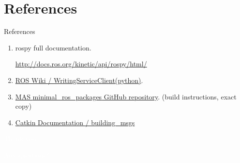 \documentclass{beamer}
\begin{document}
\section{References}
\begin{frame}{References}

    \begin{enumerate}
        \item rospy full documentation.

        \url{http://docs.ros.org/kinetic/api/rospy/html/}
        
        \item \href{http://wiki.ros.org/ROS/Tutorials/WritingServiceClient(python)}{ROS Wiki {\scriptsize/ WritingServiceClient(python)}}. 
        
        \item \href{https://github.com/mas-group/minimal_ros_packages/tree/master/srv_minimal}{MAS {\ttfamily \colorbox{gray!30!white}{minimal\_ros\_packages}} GitHub repository}. {\tiny(build instructions, exact copy) }       
        
        \item \href{http://docs.ros.org/kinetic/api/catkin/html/howto/format2/building_msgs.html}{Catkin Documentation {\scriptsize/ building\_msgs}}
    \end{enumerate}
\end{frame}



\begin{frame}[plain]{}  
    \centering
    {\huge \textcolor{white}{Thank you}}
    
    \vspace{0.5cm}
    
    {\huge \textcolor{white}{Any questions?}}
\end{frame}
\end{document}
